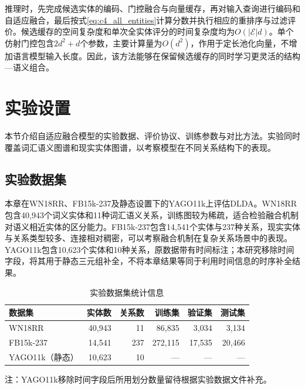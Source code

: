 推理时，先完成候选实体的编码、门控融合与向量缓存，再对输入查询进行编码和自适应融合，最后按式\eqref{eq:c4_all_entities}计算分数并执行相应的重排序与过滤评价。候选缓存的空间复杂度和单次全实体评分的时间复杂度均为$O(|\mathcal{E}|d)$。单个仿射门控包含$2d^2+d$个参数，主要计算量为$O(d^2)$，作用于定长池化向量，不增加语言模型输入长度。因此，该方法能够在保留候选缓存的同时学习更灵活的结构—语义组合。

\section{实验设置}

本节介绍自适应融合模型的实验数据、评价协议、训练参数与对比方法。实验同时覆盖词汇语义图谱和现实实体图谱，以考察模型在不同关系结构下的表现。

\subsection{实验数据集}

本章在WN18RR、FB15k-237及静态设置下的YAGO11k上评估DLDA。WN18RR包含40,943个词义实体和11种词汇语义关系，训练图较为稀疏，适合检验融合机制对语义相近实体的区分能力。FB15k-237包含14,541个实体与237种关系，现实实体与关系类型较多、连接相对稠密，可以考察融合机制在复杂关系场景中的表现。YAGO11k包含10,623个实体和10种关系，原数据带有时间标注\cite{dasgupta2018hyte}；本研究移除时间字段，将其用于静态三元组补全，不将本章结果等同于利用时间信息的时序补全结果。

\begin{table}[!htbp]
\centering
{}
\caption{实验数据集统计信息}
\label{tab:c4_datasets}
\small
\begin{tabular}{lrrrrr}
\toprule
数据集 & 实体数 & 关系数 & 训练集 & 验证集 & 测试集\\
\midrule
WN18RR & 40,943 & 11 & 86,835 & 3,034 & 3,134\\
FB15k-237 & 14,541 & 237 & 272,115 & 17,535 & 20,466\\
YAGO11k（静态） & 10,623 & 10 & --- & --- & ---\\
\bottomrule
\end{tabular}
\par\smallskip
\begin{minipage}{0.94\textwidth}\small
注：YAGO11k移除时间字段后所用划分数量留待根据实验数据文件补充。
\end{minipage}
\end{table}

